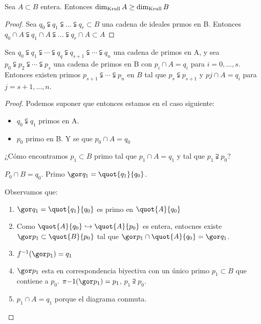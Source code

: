 \begin{corol} \label{crl:DimKrullExtension}
	Sea $A \subset B$ entera. Entonces $\dim_{\mathrm{Krull}} A \geq \dim_{\mathrm{Krull}} B$
\end{corol}

\begin{proof}
	Sea $q_0 \subsetneqq q_1 \subsetneqq ... \subsetneqq q_r \subset B$ una cadena de ideales prmos en B. Entonces $q_0\cap A \subsetneqq q_1\cap A \subsetneqq ... \subsetneqq q_r\cap A \subset A$
\end{proof}


\begin{theorem} \label{thm:GoingUp}
	Sea $q_0 \subsetneqq q_1 \subsetneqq \dotsb \subsetneqq q_q \subsetneqq q_{s+1} \subsetneqq \dotsb \subsetneqq q_n$ una cadena de primos en A, y sea $p_0 \subsetneqq p_2 \subsetneqq \dotsb \subsetneqq p_s$ una cadena de primos en B con $p_i \cap A=q_i $ para $i=0,\dotsc ,s$. Entonces existen primos $p_{s+1} \subsetneqq \dotsb \subsetneqq p_n$ en $B$ tal que $p_s \subsetneqq p_{s+1}$ y $pj \cap A = q_i$ para $j=s+1,\dotsc ,n$.
\end{theorem}

\begin{proof}
	Podemos suponer que entonces estamos en el caso siguiente:
	\begin{itemize}
		\item $q_0 \subsetneqq q_1$ primos en A.
		\item $p_0$ primo en B. Y se que $p_0 \cap A=q_0$
	\end{itemize}

	¿Cómo encontramos $p_1 \subset B$ primo tal que $p_1 \cap A=q_1$ y tal que $p_1 \supsetneqq p_0$?


	$P_0 \cap B = q_0$. Primo $\cls{q_1}=\quot{q_1}{q_0}$.

	Observamos que:
	\begin{enumerate}
		\item $\cls{q_1}=\quot{q_1}{q_0}$ es primo en $\quot{A}{q_0}$
		\item Como $\quot{A}{q_0} \hookrightarrow \quot{A}{p_0}$ es entera, entocnes existe $\cls{p_1} \subset \quot{B}{p_0}$ tal que $\cls{p_1} \cap \quot{A}{q_0}=\cls{q_1}$.
		\item $f^{-1}(\cls{p_1})=q_1$
		\item $\cls{p_1}$ esta en correspondencia biyectiva con un único primo $p_1 \subset B$ que contiene a $p_0$. $\pi{-1}(\cls{p_1})=p_1$, $p_1 \supseteqq p_0$.
		\item $p_1 \cap A=q_1$ porque el diagrama conmuta.
	\end{enumerate}
\end{proof}

